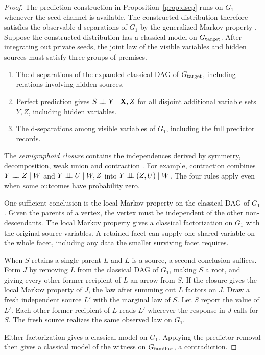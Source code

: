 \begin{proof}
The prediction construction in Proposition~\ref{prop:dsep} runs on
\(G_1\) whenever the seed channel is available. The constructed
distribution therefore satisfies the observable d-separations of \(G_1\)
by the generalized Markov property \cite{HLP}. Suppose the constructed
distribution has a classical model on \(G_{\text{target}}\). After integrating
out private seeds, the joint law of the visible variables and hidden
sources must satisfy three groups of premises.
\begin{enumerate}
\item[\textbf{P1.}] The d-separations of the expanded classical DAG of
\(G_{\text{target}}\), including relations involving hidden sources.
\item[\textbf{P2.}] Perfect prediction gives \(S\mathrel{\perp\!\!\!\perp} Y\mid\mathbf X,Z\)
for all disjoint additional variable sets \(Y,Z\), including hidden
variables.
\item[\textbf{P3.}] The d-separations among visible variables of \(G_1\),
including the full predictor records.
\end{enumerate}
The \emph{semigraphoid closure} contains the independences derived by
symmetry, decomposition, weak union and contraction \cite{Studeny}.
For example, contraction combines \(Y\mathrel{\perp\!\!\!\perp} Z\mid W\) and
\(Y\mathrel{\perp\!\!\!\perp} U\mid W,Z\) into \(Y\mathrel{\perp\!\!\!\perp}(Z,U)\mid W\). The four rules apply even
when some outcomes have probability zero.

One sufficient conclusion is the local Markov property on the
classical DAG of \(G_1\). Given the parents of a vertex, the vertex must
be independent of the other non-descendants. The local Markov property
gives a classical factorization on \(G_1\) with the original source
variables. A retained facet can supply one shared variable on the
whole facet, including any data the smaller surviving facet requires.

When \(S\) retains a single parent \(L\) and \(L\) is a source,
a second conclusion suffices. Form \(J\) by removing \(L\) from
the classical DAG of \(G_1\), making \(S\) a root, and giving every
other former recipient of \(L\) an arrow from \(S\). If the closure
gives the local Markov property of \(J\), the law after summing out
\(L\) factors on \(J\). Draw a fresh independent source \(L'\) with
the marginal law of \(S\). Let \(S\) report the value of \(L'\).
Each other former recipient of \(L\) reads \(L'\) wherever the response
in \(J\) calls for \(S\). The fresh source realizes the same observed
law on \(G_1\).

Either factorization gives a classical model on \(G_1\). Applying the
predictor removal then gives a classical model of the witness on
\(G_{\text{familiar}}\), a contradiction.
\end{proof}

